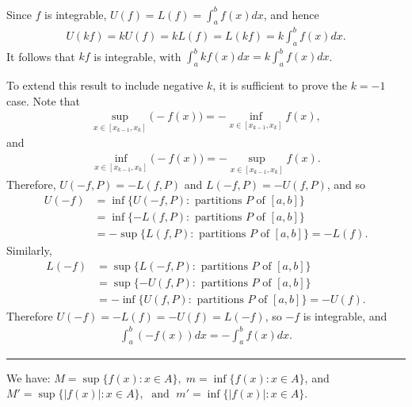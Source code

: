 \documentclass[letterpaper,10pt,english]{jupyterBook}
\begin{document}
\sphinxAtStartPar
Since \(f\) is integrable, \(U(f)=L(f)=\int_a^bf(x)dx\), and hence
\begin{equation*}
\begin{split}
U(kf)=kU(f)=kL(f)=L(kf)=k\int_a^bf(x)dx.
\end{split}
\end{equation*}
\sphinxAtStartPar
It follows that \(kf\) is integrable, with \(\displaystyle\int_a^bkf(x)dx=k\int_a^bf(x)dx\).

\sphinxAtStartPar
To extend this result to include negative \(k\), it is sufficient to prove the \(k=-1\) case. Note that
\begin{equation*}
\begin{split}
\sup_{x\in[x_{k-1},x_k]}\big(-f(x)\big) = -\inf_{x\in[x_{k-1},x_k]}f(x),
\end{split}
\end{equation*}
\sphinxAtStartPar
and
\begin{equation*}
\begin{split}
\inf_{x\in[x_{k-1},x_k]}\big(-f(x)\big) = -\sup_{x\in[x_{k-1},x_k]}f(x).
\end{split}
\end{equation*}
\sphinxAtStartPar
Therefore, \(U(-f,P)=-L(f,P)\) and \(L(-f,P)=-U(f,P)\), and so
\begin{align*}
U(-f) &= \inf\{U(-f,P):\text{ partitions } P \text{ of } [a,b]\} \\
&= \inf\{-L(f,P):\text{ partitions } P \text{ of } [a,b]\} \\
&= -\sup\{L(f,P):\text{ partitions } P \text{ of } [a,b]\} = -L(f).
\end{align*}
\sphinxAtStartPar
Similarly,
\begin{align*}
L(-f) &= \sup\{L(-f,P):\text{ partitions } P \text{ of } [a,b]\} \\
&= \sup\{-U(f,P):\text{ partitions } P \text{ of } [a,b]\} \\
&= -\inf\{U(f,P):\text{ partitions } P \text{ of } [a,b]\} = -U(f).
\end{align*}
\sphinxAtStartPar
Therefore \(U(-f) = -L(f) = -U(f) = L(-f)\), so \(-f\) is integrable, and
\begin{equation*}
\begin{split}
\int_a^b(-f(x))dx = -\int_a^b f(x)dx.
\end{split}
\end{equation*}

\bigskip\hrule\bigskip


\sphinxAtStartPar
{\hyperref[\detokenize{Problems:id72}]{}} We have: \(M=\sup\{f(x):x\in A\}, \; m=\inf\{f(x):x\in A\}\), and \(M'=\sup\{|f(x)|:x\in A\}, \; \text{ and } \; m'=\inf\{|f(x)|:x\in A\}\).
\end{document}
